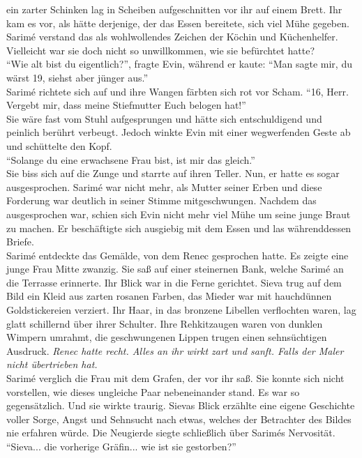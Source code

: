 ein zarter Schinken lag in Scheiben aufgeschnitten vor ihr auf einem Brett. Ihr kam es vor, als 
hätte derjenige, der das Essen bereitete, sich viel Mühe gegeben. Sarimé verstand das als 
wohlwollendes Zeichen der Köchin und Küchenhelfer. Vielleicht war sie doch nicht so unwillkommen, 
wie sie befürchtet hatte?\\
``Wie alt bist du eigentlich?'', fragte Evin, während er kaute: ``Man sagte mir, du wärst 19, 
siehst aber jünger aus.''\\
Sarimé richtete sich auf und ihre Wangen färbten sich rot vor Scham. ``16, Herr. Vergebt mir, dass 
meine Stiefmutter Euch belogen hat!''\\
Sie wäre fast vom Stuhl aufgesprungen und hätte sich entschuldigend und peinlich berührt verbeugt. 
Jedoch winkte Evin mit einer wegwerfenden Geste ab und schüttelte den Kopf.\\
``Solange du eine erwachsene Frau bist, ist mir das gleich.''\\
Sie biss sich auf die Zunge und starrte auf ihren Teller. Nun, er hatte es sogar ausgesprochen. 
Sarimé war nicht mehr, als Mutter seiner Erben und diese Forderung war deutlich in seiner Stimme 
mitgeschwungen. Nachdem das ausgesprochen war, schien sich Evin nicht mehr viel Mühe um seine junge 
Braut zu machen. Er beschäftigte sich ausgiebig mit dem Essen und las währenddessen Briefe.\\
Sarimé entdeckte das Gemälde, von dem Renec gesprochen hatte. Es zeigte eine junge Frau Mitte 
zwanzig. Sie saß auf einer steinernen Bank, welche Sarimé an die Terrasse erinnerte. Ihr Blick war 
in die Ferne gerichtet. Sieva trug auf dem Bild ein Kleid aus zarten rosanen Farben, das Mieder war 
mit hauchdünnen Goldstickereien verziert. Ihr Haar, in das bronzene Libellen verflochten waren, lag 
glatt schillernd über ihrer Schulter. Ihre Rehkitzaugen waren von dunklen Wimpern umrahmt, die 
geschwungenen Lippen trugen einen sehnsüchtigen Ausdruck. \textit{Renec hatte recht. Alles an ihr 
wirkt zart und sanft. Falls der Maler nicht übertrieben hat.}\\
Sarimé verglich die Frau mit dem Grafen, der vor ihr saß. Sie konnte sich nicht vorstellen, wie 
dieses ungleiche Paar nebeneinander stand. Es war so gegensätzlich. Und sie wirkte traurig. Sievas 
Blick erzählte eine eigene Geschichte voller Sorge, Angst und Sehnsucht nach etwas, welches der 
Betrachter des Bildes nie erfahren würde. Die Neugierde siegte schließlich über Sarimés Nervosität. 
``Sieva... die vorherige Gräfin... wie ist sie gestorben?''\\
